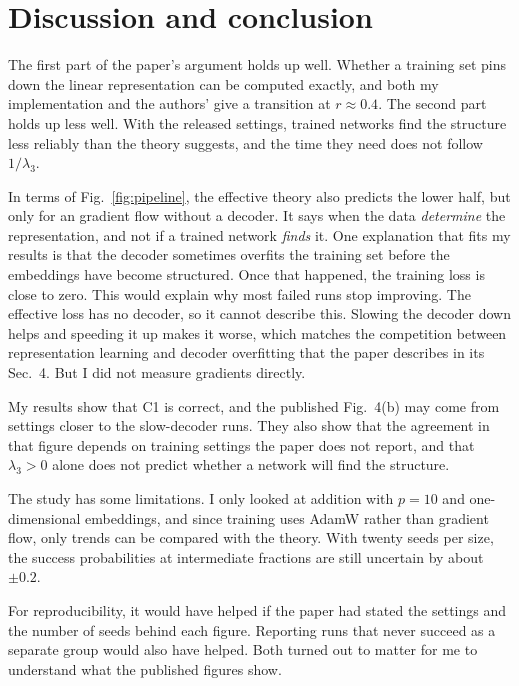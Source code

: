 \section{Discussion and conclusion}
\label{sec:discussion}

The first part of the paper's argument holds up well. Whether a training set
pins down the linear representation can be computed exactly, and both my implementation and the authors' give a transition at $r \approx 0.4$. The second part holds
up less well. With the released settings, trained networks find the structure less reliably than the theory suggests, and the time they need does not
follow $1/\lambda_3$.

In terms of Fig.~\ref{fig:pipeline}, the effective theory also predicts the
lower half, but only for an gradient flow without a decoder. It says when the data \emph{determine} the representation, and not if a trained
network \emph{finds} it. One explanation that fits my results is that the
decoder sometimes overfits the training set before the embeddings have become
structured. Once that happened, the training loss is close to zero. 
This would explain why most failed runs stop improving. The effective loss has no decoder, so it cannot
describe this. Slowing the decoder down helps and speeding it up makes it worse, which
matches the competition between representation learning and decoder
overfitting that the paper describes in its Sec.~4. But I did not measure gradients directly.

My results show that C1 is correct, and
the published Fig.~4(b) may come from settings closer to the slow-decoder runs.
They also show that the agreement in that figure depends on
training settings the paper does not report, and that $\lambda_3 > 0$ alone does not predict whether a network will find the
structure.

The study has some limitations. I only looked at addition with $p = 10$ and
one-dimensional embeddings, and since training uses AdamW rather than gradient
flow, only trends can be compared with the theory. With twenty seeds per size,
the success probabilities at intermediate fractions are still uncertain by
about $\pm 0.2$.

For reproducibility, it would have helped if the paper had stated the
settings and the number of seeds behind each figure. Reporting runs that never
succeed as a separate group would also have helped. Both turned out to matter
for me to understand what the published figures show.
